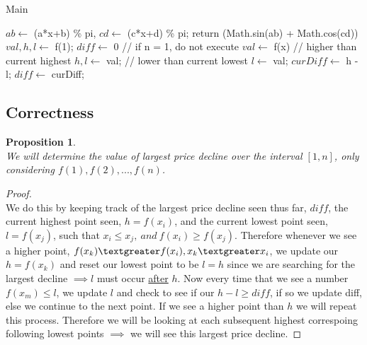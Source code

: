 \documentclass[12pt]{article}
\newtheorem{proposition}[theorem]{Proposition}
\begin{document}
\begin{algorithm}[H]
\caption{Main}
\begin{algorithmic}
        \State $ab \gets$ (a*x+b) \% pi,
        \State $cd \gets$ (c*x+d) \% pi;
        \State return (Math.sin(ab) + Math.cos(cd))
    \EndProcedure
        \State $val, h, l \gets$ f(1); $diff \gets$ 0
         // if n = 1, do not execute
            \State $val \gets$ f(x)
             // higher than current highest
                \State $h, l \gets$ val;
             // lower than current lowest
                \State $l \gets$ val; $curDiff \gets$ h - l;
                    $diff \gets$ curDiff;
                \EndIf
            \EndIf
        \EndFor
        \State {}
    \EndProcedure
\end{algorithmic}
\end{algorithm}



\subsection{Correctness}
\begin{proposition}
~ \\ \indent We will determine the value of largest price decline over the interval $[1, n]$,
only considering $f(1), f(2),..., f(n)$.
\end{proposition}

\begin{proof}
~ \\ \indent We do this by keeping track of the largest price decline seen thus far, $diff$,
the current highest point seen, $h = f(x_i)$, and the current lowest point seen, $l = f(x_j)$,
such that $x_i \leq x_j,\ and\ f(x_i) \geq f(x_j)$. Therefore whenever we see a higher point,
$f(x_k) \textgreater f(x_i), x_k \textgreater x_i$, we update our $h = f(x_k)$ and reset our
lowest point to be $l = h$ since we are searching for the largest decline $\implies l$ must
occur \underline{after} $h$. Now every time that we see a number $f(x_m) \leq l$, we update
$l$ and check to see if our $h - l \geq diff$, if so we update diff, else we continue to the
next point.  If we see a higher point than $h$ we will repeat this process. Therefore we will
be looking at each subsequent highest correspoing following lowest points $\implies$ we will
see this largest price decline.
\end{proof}
\end{document}
